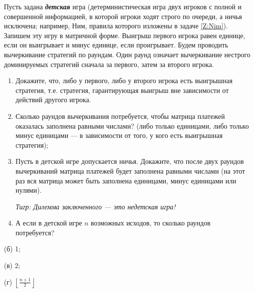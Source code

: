 \begin{problem}[Детские игры \cite{ewerhart:clg}] %
Пусть задана {\bf {\it детская}} игра (детерминистическая игра двух игроков с полной и совершенной информацией, в которой игроки ходят строго по очереди, а ничья исключена; например, Ним, правила которого изложены в задаче \ref{Z:Nim}). Запишем эту игру в матричной форме. Выигрыш первого игрока равен единице, если он выигрывает и минус единице, если проигрывает. Будем проводить вычеркивание стратегий по раундам. Один раунд означает вычеркивание нестрого доминируемых стратегий сначала за первого, затем за второго игрока.\par
\begin{enumerate}
\item 	Докажите, что, либо у первого, либо у второго игрока есть выигрышная стратегия, т.е. стратегия, гарантирующая выигрыш вне зависимости от действий другого игрока.\par
\item 	Сколько раундов вычеркивания потребуется, чтобы матрица платежей оказалась заполнена равными числами? (либо только единицами, либо только минус единицами — в зависимости от того, у кого есть выигрышная стратегия);\par
\item 	Пусть в детской игре допускается ничья. Докажите, что после двух раундов вычеркиваний матрица платежей будет заполнена равными числами (на этот раз вся матрица может быть заполнена единицами, минус единицами или нулями).\par
{\it Тигр: Дилемма заключенного — это недетская игра!}\par

\item А если в детской игре $n$ возможных исходов, то сколько раундов потребуется?
\end{enumerate}


\begin{sol}
(б) 1;

(в) 2;

(г) $\left\lfloor  \frac{n+1}{2} \right\rfloor$
\end{sol}
\end{problem}


